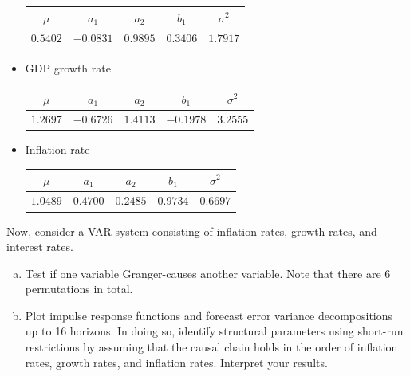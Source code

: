 \documentclass[answers]{exam}
\begin{document}
\begin{questions}
\begin{solution}
\begin{itemize}
          \begin{center}
          \begin{tabular}{*5c}
            \toprule
            $\mu$ & $a_{1}$ & $a_{2}$ & $b_{1}$ & $\sigma^{2}$ \\
            \midrule
            $0.5402$ & $-0.0831$ & $0.9895$ & $0.3406$ & $1.7917$\\
            \bottomrule
          \end{tabular}
          \end{center}
        \item GDP growth rate
        \begin{center}
          \begin{tabular}{*5c}
            \toprule
            $\mu$ & $a_{1}$ & $a_{2}$ & $b_{1}$ & $\sigma^{2}$ \\
            \midrule
            $1.2697$ & $-0.6726$ & $1.4113$ & $-0.1978$ & $3.2555$\\
            \bottomrule
          \end{tabular}
          \end{center}
        \item Inflation rate
        \begin{center}
          \begin{tabular}{*5c}
            \toprule
            $\mu$ & $a_{1}$ & $a_{2}$ & $b_{1}$ & $\sigma^{2}$ \\
            \midrule
            $1.0489$ & $0.4700$ & $0.2485$ & $0.9734$ & $0.6697$\\
            \bottomrule
          \end{tabular}
          \end{center}
    \end{itemize}
    \end{solution}
    \question
    Now, consider a VAR system consisting of inflation rates, growth rates, and interest rates.
    \begin{enumerate}[(a)]
        \item Test if one variable Granger-causes another variable. Note that there are 6 permutations in total.
        \item Plot impulse response functions and forecast error variance decompositions up to 16 horizons. In doing so, identify structural parameters using short-run restrictions by assuming that the causal chain holds in the order of inflation rates, growth rates, and inflation rates. Interpret your results.

\end{enumerate}
\end{questions}
\end{document}
